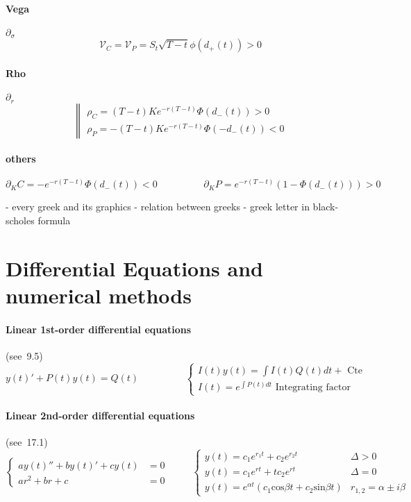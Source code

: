 \documentclass[a4paper,10pt]{article}
\begin{document}
\paragraph{Vega}$\partial_{\sigma}$
\[
\mathcal{V}_C = \mathcal{V}_P = S_t \sqrt{T-t} \phi(d_+(t))>0
\]
\paragraph{Rho} $\partial_{r}$
\[
\left\| 
\begin{array}{l}
\rho_C = (T-t)Ke^{-r(T-t)}\Phi(d_-(t))    > 0 \\
\rho_P = -(T-t)Ke^{-r(T-t)}\Phi(-d_-(t))  < 0
\end{array}\right. 
\]
\paragraph{others}
\[
\partial_{K}C = -e^{-r(T-t)} \Phi(d_-(t)) <0
\hspace{2cm}
\partial_{K}P = e^{-r(T-t)} (1-\Phi(d_-(t))) >0
\]

- every greek and its graphics
- relation between greeks
- greek letter in black-scholes formula

\section{Differential Equations and numerical methods}
\paragraph{Linear 1st-order differential equations} (see~\cite{STEWART}9.5)
\[
y(t)' + P(t)y(t) = Q(t)
\hspace{2cm}
\left\{ 
\begin{array}{l}
I(t)y(t) = \int I(t)Q(t)dt + \text{ Cte }           \\
I(t) = e^{\int P(t)dt } \text{ Integrating factor} 
\end{array}\right. 
\]
\paragraph{Linear 2nd-order differential equations} (see~\cite{STEWART}17.1)
\[
\left\{ 
\begin{array}{rl}
ay(t)'' + by(t)' + c y(t) &= 0   \\
           ar^2 + br + c  &= 0   
\end{array}\right. 
\hspace{1cm}
\left\{ 
\begin{array}{ll}
y(t)=c_1 e^{r_1 t} + c_2 e^{r_2 t} & \Delta >0 \\
y(t)=c_1 e^{r t} + t c_2 e^{r t}   & \Delta =0 \\
y(t)=e^{\alpha t}( c_1 \text{cos}\beta t + c_2 \text{sin}\beta t ) & r_{1,2} = \alpha \pm i \beta
\end{array}\right.
\]
\end{document}
